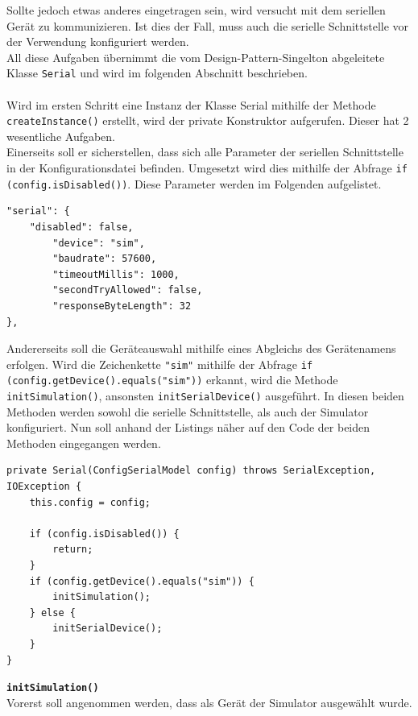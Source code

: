 Sollte jedoch etwas anderes eingetragen sein, wird versucht mit dem seriellen Gerät zu kommunizieren.
Ist dies der Fall, muss auch die serielle Schnittstelle vor der Verwendung konfiguriert werden.\\
All diese Aufgaben übernimmt die vom Design-Pattern-Singelton abgeleitete Klasse \lstinline[style=java]{Serial} und wird im folgenden Abschnitt beschrieben.\\\\
Wird im ersten Schritt eine Instanz der Klasse Serial mithilfe der Methode \lstinline[style=java]{createInstance()} erstellt, wird der private Konstruktor aufgerufen.
Dieser hat 2 wesentliche Aufgaben.\\
Einerseits soll er sicherstellen, dass sich alle Parameter der seriellen Schnittstelle in der Konfigurationsdatei befinden.
Umgesetzt wird dies mithilfe der Abfrage \lstinline[style=java]{if (config.isDisabled())}.
Diese Parameter werden im Folgenden aufgelistet.
\begin{lstlisting}[style=json,caption=Teilabschnitt Konfigurationsdatei,label=jsonSerial]
"serial": {
    "disabled": false,
        "device": "sim",
        "baudrate": 57600,
        "timeoutMillis": 1000,
        "secondTryAllowed": false,
        "responseByteLength": 32
},
\end{lstlisting}
Andererseits soll die Geräteauswahl mithilfe eines Abgleichs des Gerätenamens erfolgen.
Wird die Zeichenkette \lstinline[style=json]{"sim"} mithilfe der Abfrage \lstinline[style=java]{if (config.getDevice().equals("sim"))} erkannt, wird die Methode \lstinline[style=java]{initSimulation()}, ansonsten \lstinline[style=java]{initSerialDevice()} ausgeführt.
In diesen beiden Methoden werden sowohl die serielle Schnittstelle, als auch der Simulator konfiguriert.
Nun soll anhand der Listings näher auf den Code der beiden Methoden eingegangen werden.
\begin{lstlisting}[style=java,caption=Konstruktor Serial(),label=serialInit]
private Serial(ConfigSerialModel config) throws SerialException, IOException {
    this.config = config;

    if (config.isDisabled()) {
        return;
    }
    if (config.getDevice().equals("sim")) {
        initSimulation();
    } else {
        initSerialDevice();
    }
}
\end{lstlisting}
\textbf{\lstinline{initSimulation()}}
\\
Vorerst soll angenommen werden, dass als Gerät der Simulator ausgewählt wurde.
